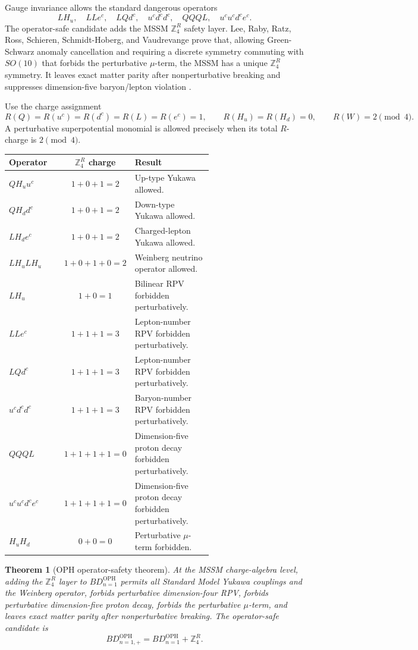 \documentclass[11pt]{article}
\newtheorem{theorem}{Theorem}[section]
\theoremstyle{remark}
\theoremstyle{plain}
\newcommand{\OPH}{\mathrm{OPH}}
\newcommand{\ZfourR}{\mathbb Z_4^R}
\begin{document}
Gauge invariance allows the standard dangerous operators
\[
LH_u,\quad LLe^c,\quad LQd^c,\quad u^cd^cd^c,\quad QQQL,\quad u^cu^cd^ce^c.
\]
The operator-safe candidate adds the MSSM \(\ZfourR\) safety layer. Lee, Raby, Ratz, Ross,
Schieren, Schmidt-Hoberg, and Vaudrevange prove that, allowing Green-Schwarz anomaly
cancellation and requiring a discrete symmetry commuting with \(SO(10)\) that forbids the
perturbative \(\mu\)-term, the MSSM has a unique \(\ZfourR\) symmetry. It leaves exact matter
parity after nonperturbative breaking and suppresses dimension-five baryon/lepton violation
\cite{LeeRabyRatzRossSchierenSchmidtHobergVaudrevange2010}.

Use the charge assignment
\[
R(Q)=R(u^c)=R(d^c)=R(L)=R(e^c)=1,
\qquad
R(H_u)=R(H_d)=0,
\qquad
R(W)=2\pmod4.
\]
A perturbative superpotential monomial is allowed precisely when its total \(R\)-charge is
\(2\pmod4\).

\begin{longtable}{p{0.28\linewidth}c p{0.40\linewidth}}
\toprule
\textbf{Operator} & \textbf{\(\ZfourR\) charge} & \textbf{Result} \\
\midrule
\(QH_uu^c\) & \(1+0+1=2\) & Up-type Yukawa allowed. \\
\(QH_dd^c\) & \(1+0+1=2\) & Down-type Yukawa allowed. \\
\(LH_de^c\) & \(1+0+1=2\) & Charged-lepton Yukawa allowed. \\
\(LH_uLH_u\) & \(1+0+1+0=2\) & Weinberg neutrino operator allowed. \\
\(LH_u\) & \(1+0=1\) & Bilinear RPV forbidden perturbatively. \\
\(LLe^c\) & \(1+1+1=3\) & Lepton-number RPV forbidden perturbatively. \\
\(LQd^c\) & \(1+1+1=3\) & Lepton-number RPV forbidden perturbatively. \\
\(u^cd^cd^c\) & \(1+1+1=3\) & Baryon-number RPV forbidden perturbatively. \\
\(QQQL\) & \(1+1+1+1=0\) & Dimension-five proton decay forbidden perturbatively. \\
\(u^cu^cd^ce^c\) & \(1+1+1+1=0\) & Dimension-five proton decay forbidden perturbatively. \\
\(H_uH_d\) & \(0+0=0\) & Perturbative \(\mu\)-term forbidden. \\
\bottomrule
\end{longtable}

\begin{theorem}[OPH operator-safety theorem]
At the MSSM charge-algebra level, adding the \(\ZfourR\) layer to \(BD_{n=1}^{\OPH}\) permits
all Standard Model Yukawa couplings and the Weinberg operator, forbids perturbative
dimension-four RPV, forbids perturbative dimension-five proton decay, forbids the perturbative
\(\mu\)-term, and leaves exact matter parity after nonperturbative breaking. The operator-safe
candidate is
\[
BD_{n=1,+}^{\OPH}=BD_{n=1}^{\OPH}+\ZfourR.
\]
\end{theorem}
\end{document}
